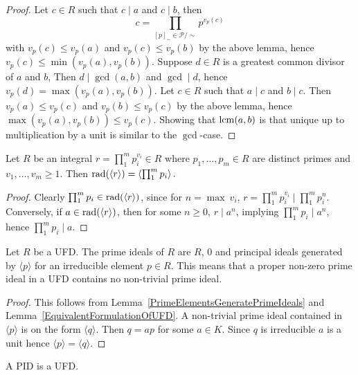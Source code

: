 \begin{proof}
    Let $c\in R$ such that $c \mid a$ and $c\mid b$, then 
    $$c=\prod_{[p]_\sim \in \mathcal{P}/\sim} p^{v_p(c)} $$
    with $v_p(c)\leq v_p(a)$ and $v_p(c)\leq v_p(b)$ by the above lemma, hence $v_p(c)\leq \min(v_p(a),v_p(b))$. Suppose $d\in R$ is a greatest common divisor of $a$ and $b$, Then $d\mid \gcd(a,b)$ and $\gcd\mid d$, hence $v_p(d)=\max(v_p(a),v_p(b))$. Let $c\in R$ such that $a \mid c$ and $b \mid c$. Then $v_p(a)\leq v_p(c)$ and $v_p(b)\leq v_p(c)$ by the above lemma, hence $\max(v_p(a),v_p(b))\leq v_p(c)$. Showing that $\mathrm{lcm}(a,b)$ is that unique up to multiplication by a unit is similar to the $\gcd$-case.
\end{proof}
\begin{lemma}\label{RadicalOfPrincipalIdealInUFD}
    Let $R$ be an integral $r = \prod_1^m p_i^{v_i} \in R$ where $p_1,\dots,p_m\in R$ are distinct primes and $v_1,\dots,v_m\geq 1$. Then $\mathrm{rad}(\langle r\rangle) = \left\langle \prod_1^m p_i \right\rangle.$
\end{lemma}
\begin{proof}
    Clearly $\prod_1^m p_i\in \mathrm{rad}(\langle r\rangle)$, since for $n = \max \ 
 v_i$, $r=\prod_1^m p_i^{v_i}\mid \prod_1^m p_i^n$. Conversely, if $a\in \mathrm{rad}(\langle r\rangle)$, then for some $n\geq 0$, $r\mid a^n$, implying $\prod_1^mp_i\mid a^n$, hence $\prod_1^m p_i\mid a$.
\end{proof}
\begin{lemma}\label{PrimeIdealsInAUFD}
    Let $R$ be a UFD. The prime ideals of $R$ are $R$, $0$ and principal ideals generated by $\langle p\rangle$ for an irreducible element $p\in R$. This means that a proper non-zero prime ideal in a UFD contains no non-trivial prime ideal. 
\end{lemma}
\begin{proof}
    This follows from Lemma~\ref{PrimeElementsGeneratePrimeIdeals} and Lemma~\ref{EquivalentFormulationOfUFD}. A non-trivial prime ideal contained in $\langle p \rangle$ is on the form $\langle q\rangle$. Then $q = ap$ for some $a\in K$. Since $q$ is irreducible $a$ is a unit hence $\langle p \rangle = \langle q\rangle$. 
\end{proof}
\begin{lemma}
        A PID is a UFD.
    \end{lemma}
